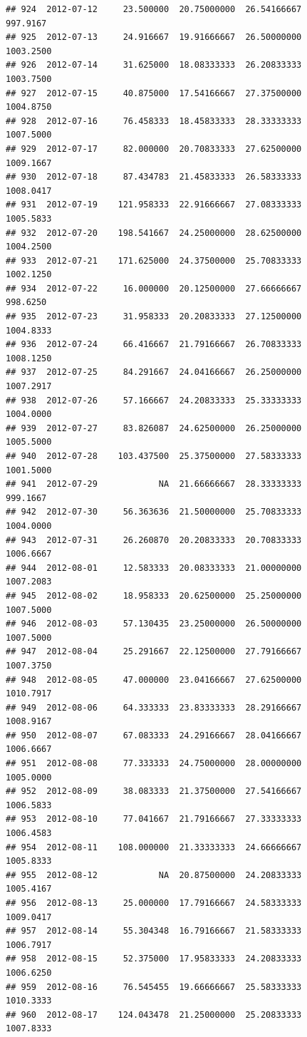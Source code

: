 \documentclass[
]{article}
\begin{document}
\begin{verbatim}
## 924  2012-07-12     23.500000  20.75000000  26.54166667     997.9167
## 925  2012-07-13     24.916667  19.91666667  26.50000000    1003.2500
## 926  2012-07-14     31.625000  18.08333333  26.20833333    1003.7500
## 927  2012-07-15     40.875000  17.54166667  27.37500000    1004.8750
## 928  2012-07-16     76.458333  18.45833333  28.33333333    1007.5000
## 929  2012-07-17     82.000000  20.70833333  27.62500000    1009.1667
## 930  2012-07-18     87.434783  21.45833333  26.58333333    1008.0417
## 931  2012-07-19    121.958333  22.91666667  27.08333333    1005.5833
## 932  2012-07-20    198.541667  24.25000000  28.62500000    1004.2500
## 933  2012-07-21    171.625000  24.37500000  25.70833333    1002.1250
## 934  2012-07-22     16.000000  20.12500000  27.66666667     998.6250
## 935  2012-07-23     31.958333  20.20833333  27.12500000    1004.8333
## 936  2012-07-24     66.416667  21.79166667  26.70833333    1008.1250
## 937  2012-07-25     84.291667  24.04166667  26.25000000    1007.2917
## 938  2012-07-26     57.166667  24.20833333  25.33333333    1004.0000
## 939  2012-07-27     83.826087  24.62500000  26.25000000    1005.5000
## 940  2012-07-28    103.437500  25.37500000  27.58333333    1001.5000
## 941  2012-07-29            NA  21.66666667  28.33333333     999.1667
## 942  2012-07-30     56.363636  21.50000000  25.70833333    1004.0000
## 943  2012-07-31     26.260870  20.20833333  20.70833333    1006.6667
## 944  2012-08-01     12.583333  20.08333333  21.00000000    1007.2083
## 945  2012-08-02     18.958333  20.62500000  25.25000000    1007.5000
## 946  2012-08-03     57.130435  23.25000000  26.50000000    1007.5000
## 947  2012-08-04     25.291667  22.12500000  27.79166667    1007.3750
## 948  2012-08-05     47.000000  23.04166667  27.62500000    1010.7917
## 949  2012-08-06     64.333333  23.83333333  28.29166667    1008.9167
## 950  2012-08-07     67.083333  24.29166667  28.04166667    1006.6667
## 951  2012-08-08     77.333333  24.75000000  28.00000000    1005.0000
## 952  2012-08-09     38.083333  21.37500000  27.54166667    1006.5833
## 953  2012-08-10     77.041667  21.79166667  27.33333333    1006.4583
## 954  2012-08-11    108.000000  21.33333333  24.66666667    1005.8333
## 955  2012-08-12            NA  20.87500000  24.20833333    1005.4167
## 956  2012-08-13     25.000000  17.79166667  24.58333333    1009.0417
## 957  2012-08-14     55.304348  16.79166667  21.58333333    1006.7917
## 958  2012-08-15     52.375000  17.95833333  24.20833333    1006.6250
## 959  2012-08-16     76.545455  19.66666667  25.58333333    1010.3333
## 960  2012-08-17    124.043478  21.25000000  25.20833333    1007.8333

\end{verbatim}
\end{document}
